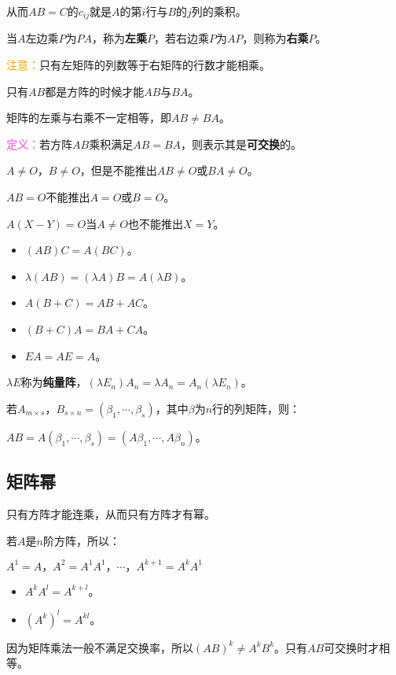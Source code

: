 \documentclass[UTF8, 12pt]{ctexart}
\begin{document}
从而$AB=C$的$c_{ij}$就是$A$的第$i$行与$B$的$j$列的乘积。

当$A$左边乘$P$为$PA$，称为\textbf{左乘}$P$，若右边乘$P$为$AP$，则称为\textbf{右乘}$P$。

\textcolor{orange}{注意：}只有左矩阵的列数等于右矩阵的行数才能相乘。

只有$AB$都是方阵的时候才能$AB$与$BA$。

矩阵的左乘与右乘不一定相等，即$AB\neq BA$。

\textcolor{violet}{\textbf{定义：}}若方阵$AB$乘积满足$AB=BA$，则表示其是\textbf{可交换}的。

$A\neq O$，$B\neq O$，但是不能推出$AB\neq O$或$BA\neq O$。

$AB=O$不能推出$A=O$或$B=O$。

$A(X-Y)=O$当$A\neq O$也不能推出$X=Y$。

\begin{itemize}
\item $(AB)C=A(BC)$。
\item $\lambda(AB)=(\lambda A)B=A(\lambda B)$。
\item $A(B+C)=AB+AC$。
\item $(B+C)A=BA+CA$。
\item $EA=AE=A$。
\end{itemize}

$\lambda E$称为\textbf{纯量阵}，$(\lambda E_n)A_n=\lambda A_n=A_n(\lambda E_n)$。

若$A_{m\times s}$，$B_{s\times n}=(\beta_1,\cdots,\beta_s)$，其中$\beta$为$n$行的列矩阵，则：

$AB=A(\beta_1,\cdots,\beta_s)=(A\beta_1,\cdots,A\beta_n)$。

\subsection{矩阵幂}

只有方阵才能连乘，从而只有方阵才有幂。

若$A$是$n$阶方阵，所以：

$A^1=A\text{，}A^2=A^1A^1\text{，}\cdots\text{，}A^{k+1}=A^kA^1$

\begin{itemize}
\item $A^kA^l=A^{k+l}$。
\item $(A^k)^l=A^{kl}$。
\end{itemize}

因为矩阵乘法一般不满足交换率，所以$(AB)^k\neq A^kB^k$。只有$AB$可交换时才相等。
\end{document}
